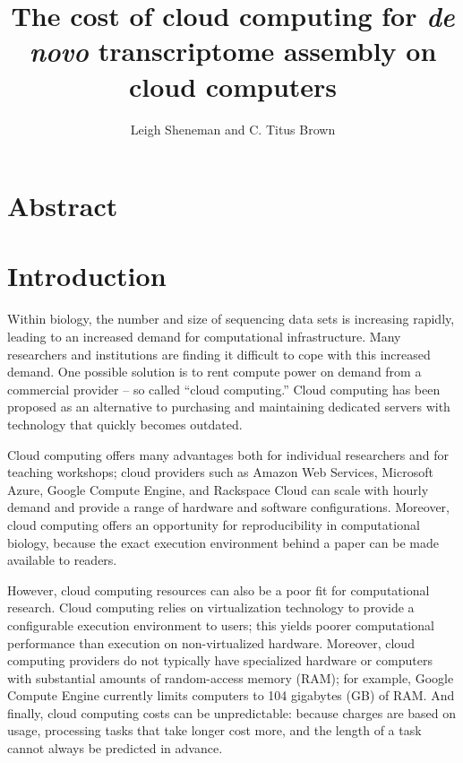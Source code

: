 \documentclass[11pt]{article}
\begin{document}
\title{The cost of cloud computing for {\em de novo} transcriptome assembly on cloud computers}
\author{Leigh Sheneman and C. Titus Brown}
\maketitle

\section*{Abstract}

\section*{Introduction}

Within biology, the number and size of sequencing data sets is increasing
rapidly, leading to an increased demand for computational infrastructure.
Many researchers and institutions are finding it difficult to cope with
this increased demand.  One possible solution is to rent compute power
on demand from a commercial provider -- so called ``cloud computing.''
Cloud computing has been proposed as an alternative to purchasing and 
maintaining dedicated servers with technology that quickly becomes outdated. 


Cloud computing offers many advantages both for individual researchers
and for teaching workshops; cloud providers such as Amazon Web
Services, Microsoft Azure, Google Compute Engine, and Rackspace Cloud
can scale with hourly demand and provide a range of hardware and
software configurations.  Moreover, cloud computing offers an
opportunity for reproducibility in computational biology, because
the exact execution environment behind a paper can be made available
to readers.

However, cloud computing resources can also be a poor fit for
computational research.  Cloud computing relies on virtualization
technology to provide a configurable execution environment to users;
this yields poorer computational performance than execution on
non-virtualized hardware.  Moreover, cloud computing providers do
not typically have specialized hardware or computers with substantial
amounts of random-access memory (RAM); for example, Google Compute
Engine currently limits computers to 104 gigabytes (GB) of RAM.
And finally, cloud computing costs can be unpredictable: because
charges are based on usage, processing tasks that take longer cost more,
and the length of a task cannot always be predicted in advance.
\end{document}
